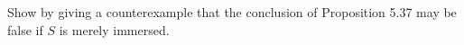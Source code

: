 Show by giving a counterexample that the conclusion of Proposition 5.37 may be false if $S$ is merely immersed.
